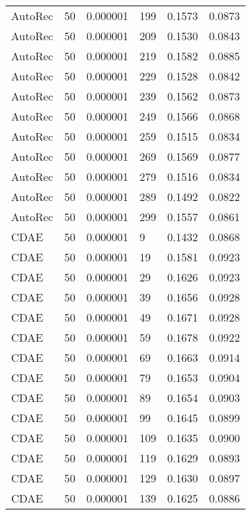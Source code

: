 \begin{tabular}{llrlrr}
 AutoRec &   50 &  0.000001 &   199 &  0.1573 &       0.0873 \\
 AutoRec &   50 &  0.000001 &   209 &  0.1530 &       0.0843 \\
 AutoRec &   50 &  0.000001 &   219 &  0.1582 &       0.0885 \\
 AutoRec &   50 &  0.000001 &   229 &  0.1528 &       0.0842 \\
 AutoRec &   50 &  0.000001 &   239 &  0.1562 &       0.0873 \\
 AutoRec &   50 &  0.000001 &   249 &  0.1566 &       0.0868 \\
 AutoRec &   50 &  0.000001 &   259 &  0.1515 &       0.0834 \\
 AutoRec &   50 &  0.000001 &   269 &  0.1569 &       0.0877 \\
 AutoRec &   50 &  0.000001 &   279 &  0.1516 &       0.0834 \\
 AutoRec &   50 &  0.000001 &   289 &  0.1492 &       0.0822 \\
 AutoRec &   50 &  0.000001 &   299 &  0.1557 &       0.0861 \\
    CDAE &   50 &  0.000001 &     9 &  0.1432 &       0.0868 \\
    CDAE &   50 &  0.000001 &    19 &  0.1581 &       0.0923 \\
    CDAE &   50 &  0.000001 &    29 &  0.1626 &       0.0923 \\
    CDAE &   50 &  0.000001 &    39 &  0.1656 &       0.0928 \\
    CDAE &   50 &  0.000001 &    49 &  0.1671 &       0.0928 \\
    CDAE &   50 &  0.000001 &    59 &  0.1678 &       0.0922 \\
    CDAE &   50 &  0.000001 &    69 &  0.1663 &       0.0914 \\
    CDAE &   50 &  0.000001 &    79 &  0.1653 &       0.0904 \\
    CDAE &   50 &  0.000001 &    89 &  0.1654 &       0.0903 \\
    CDAE &   50 &  0.000001 &    99 &  0.1645 &       0.0899 \\
    CDAE &   50 &  0.000001 &   109 &  0.1635 &       0.0900 \\
    CDAE &   50 &  0.000001 &   119 &  0.1629 &       0.0893 \\
    CDAE &   50 &  0.000001 &   129 &  0.1630 &       0.0897 \\
    CDAE &   50 &  0.000001 &   139 &  0.1625 &       0.0886 \\

\end{tabular}
